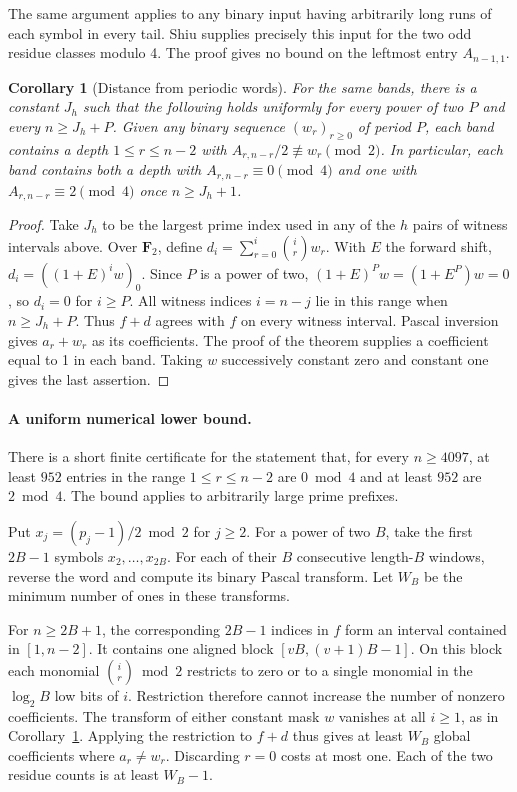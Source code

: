 \documentclass[11pt,a4paper]{article}
\newtheorem{corollary}[theorem]{Corollary}
\begin{document}
The same argument applies to any binary input having arbitrarily long runs
of each symbol in every tail. Shiu supplies precisely this input for the two
odd residue classes modulo 4. The proof gives no bound on the leftmost
entry $A_{n-1,1}$.

\begin{corollary}[Distance from periodic words]\label{diag:mask}
For the same bands, there is a constant $J_h$ such that the following
holds uniformly for every power of two $P$ and every $n\ge J_h+P$.
Given any binary sequence $(w_r)_{r\ge0}$ of period $P$, each band
contains a depth $1\le r\le n-2$ with
$A_{r,n-r}/2\not\equiv w_r\pmod2$.
In particular, each band contains both a depth with
$A_{r,n-r}\equiv0\pmod4$ and one with $A_{r,n-r}\equiv2\pmod4$
once $n\ge J_h+1$.\end{corollary}

\begin{proof}
Take $J_h$ to be the largest prime index used in any of the $h$ pairs
of witness intervals above. Over $\mathbf F_2$, define
$d_i=\sum_{r=0}^i\binom{i}{r}w_r$. With $E$ the forward shift,
$d_i=((1+E)^iw)_0$. Since $P$ is a power of two,
$(1+E)^Pw=(1+E^P)w=0$, so $d_i=0$ for $i\ge P$.
All witness indices $i=n-j$ lie in this range when $n\ge J_h+P$.
Thus $f+d$ agrees with $f$ on every witness interval. Pascal inversion
gives $a_r+w_r$ as its coefficients. The proof of the theorem supplies a
coefficient equal to 1 in each band. Taking $w$ successively constant
zero and constant one gives the last assertion.
\end{proof}

\paragraph{A uniform numerical lower bound.}
There is a short finite certificate for the statement that, for every $n\ge4097$, at least $952$ entries in the range $1\le r\le n-2$ are $0\bmod4$ and at least $952$ are $2\bmod4$. The bound applies to arbitrarily large prime prefixes.

Put $x_j=(p_j-1)/2\bmod2$ for $j\ge2$. For a power of two $B$, take the first $2B-1$ symbols $x_2,\ldots,x_{2B}$. For each of their $B$ consecutive length-$B$ windows, reverse the word and compute its binary Pascal transform. Let $W_B$ be the minimum number of ones in these transforms.

For $n\ge2B+1$, the corresponding $2B-1$ indices in $f$ form an interval contained in $[1,n-2]$. It contains one aligned block $[vB,(v+1)B-1]$. On this block each monomial $\binom{i}{r}\bmod2$ restricts to zero or to a single monomial in the $\log_2 B$ low bits of $i$. Restriction therefore cannot increase the number of nonzero coefficients. The transform of either constant mask $w$ vanishes at all $i\ge1$, as in Corollary~\ref{diag:mask}. Applying the restriction to $f+d$ thus gives at least $W_B$ global coefficients where $a_r\ne w_r$. Discarding $r=0$ costs at most one. Each of the two residue counts is at least $W_B-1$.
\end{document}
